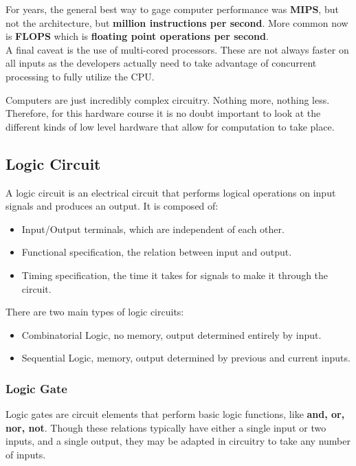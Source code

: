 \documentclass[12pt, twoside, exarticle]{article}
\begin{document}
For years, the general best way to gage computer performance was \textbf{MIPS}, but not the architecture, but \textbf{million instructions per second}.  More common now is \textbf{FLOPS} which is \textbf{floating point operations per second}. \\

A final caveat is the use of multi-cored processors.  These are not always faster on all inputs as the developers actually need to take advantage of concurrent processing to fully utilize the CPU. \\


Computers are just incredibly complex circuitry.  Nothing more, nothing less.  Therefore, for this hardware course it is no doubt important to look at the different kinds of low level hardware that allow for computation to take place. \\

\subsection{Logic Circuit}

A logic circuit is an electrical circuit that performs logical operations on input signals and produces an output.  It is composed of:
\begin{itemize}
\item Input/Output terminals, which are independent of each other.
\item Functional specification, the relation between input and output.
\item Timing specification, the time it takes for signals to make it through the circuit.
\end{itemize}

There are two main types of logic circuits: \\
\begin{itemize}
\item Combinatorial Logic, no memory, output determined entirely by input.
\item Sequential Logic, memory, output determined by previous and current inputs.
\end{itemize}

\subsubsection{Logic Gate}

Logic gates are circuit elements that perform basic logic functions, like \textbf{and, or, nor, not}.	 Though these relations typically have either a single input or two inputs, and a single output, they may be adapted in circuitry to take any number of inputs. \\
\end{document}
